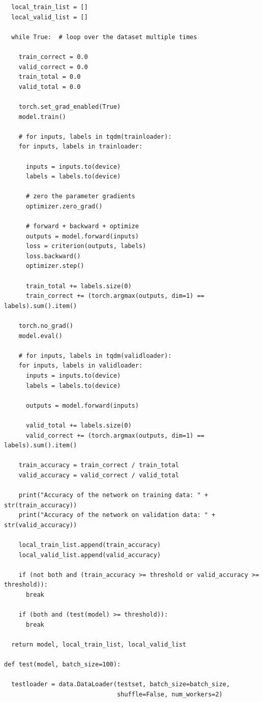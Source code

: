\documentclass{article}
\newcommand{\1}{\mathbf{1}}
\begin{document}
{\begin{verbatim}
  local_train_list = []
  local_valid_list = []

  while True:  # loop over the dataset multiple times

    train_correct = 0.0
    valid_correct = 0.0
    train_total = 0.0
    valid_total = 0.0

    torch.set_grad_enabled(True)
    model.train()

    # for inputs, labels in tqdm(trainloader):
    for inputs, labels in trainloader:

      inputs = inputs.to(device)
      labels = labels.to(device)

      # zero the parameter gradients
      optimizer.zero_grad()

      # forward + backward + optimize
      outputs = model.forward(inputs)
      loss = criterion(outputs, labels)
      loss.backward()
      optimizer.step()
        
      train_total += labels.size(0)
      train_correct += (torch.argmax(outputs, dim=1) == labels).sum().item()
    
    torch.no_grad()
    model.eval()

    # for inputs, labels in tqdm(validloader):
    for inputs, labels in validloader:
      inputs = inputs.to(device)
      labels = labels.to(device)

      outputs = model.forward(inputs)
        
      valid_total += labels.size(0)
      valid_correct += (torch.argmax(outputs, dim=1) == labels).sum().item()

    train_accuracy = train_correct / train_total
    valid_accuracy = valid_correct / valid_total

    print("Accuracy of the network on training data: " + str(train_accuracy))
    print("Accuracy of the network on validation data: " + str(valid_accuracy))

    local_train_list.append(train_accuracy)
    local_valid_list.append(valid_accuracy)
    
    if (not both and (train_accuracy >= threshold or valid_accuracy >= threshold)):
      break
    
    if (both and (test(model) >= threshold)):
      break

  return model, local_train_list, local_valid_list

def test(model, batch_size=100):

  testloader = data.DataLoader(testset, batch_size=batch_size,
                               shuffle=False, num_workers=2)


\end{verbatim}}
\end{document}
